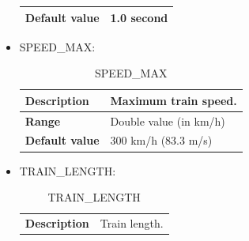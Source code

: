 \begin{itemize}
\begin{longtable}{|l|l|}
					\begin{minipage}[t]{0.22\linewidth} \textbf{Default value}	\end{minipage}
				&	\begin{minipage}[t]{0.78\linewidth} 1.0 second \end{minipage} \\

				\hline

			\end{longtable}

		\item SPEED\_MAX:

			\begin{longtable}{|l|l|}
				\caption{SPEED\_MAX}\\
				\hline

					\begin{minipage}[t]{0.22\linewidth} \textbf{Description}	\end{minipage}
				&	\begin{minipage}[t]{0.78\linewidth} Maximum train speed. \end{minipage} \\

				\hline

					\begin{minipage}[t]{0.22\linewidth} \textbf{Range}	\end{minipage}
				&	\begin{minipage}[t]{0.78\linewidth} Double value (in km/h) \end{minipage} \\

				\hline

					\begin{minipage}[t]{0.22\linewidth} \textbf{Default value}	\end{minipage}
				&	\begin{minipage}[t]{0.78\linewidth} 300 km/h (83.3 m/s) \end{minipage} \\

				\hline

			\end{longtable}

		\item TRAIN\_LENGTH:

			\begin{longtable}{|l|l|}
				\caption{TRAIN\_LENGTH}\\
				\hline

					\begin{minipage}[t]{0.22\linewidth} \textbf{Description}	\end{minipage}
				&	\begin{minipage}[t]{0.78\linewidth} Train length. \end{minipage} \\


\end{longtable}
\end{itemize}
